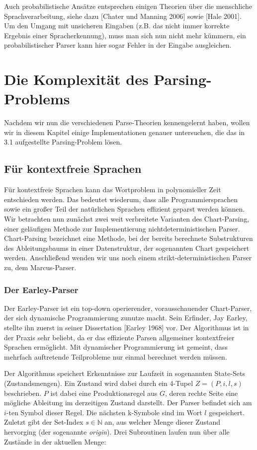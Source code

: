 \documentclass[12pt,a4paper]{article}
\theoremstyle{definition}
\begin{document}
		Auch probabilistische Ansätze entsprechen einigen Theorien über die menschliche Sprachverarbeitung, siehe dazu [Chater und Manning 2006] sowie [Hale 2001]. Um den Umgang mit unsicheren Eingaben (z.B. das nicht immer korrekte Ergebnis einer Spracherkennung), muss man sich nun nicht mehr kümmern, ein probabilistischer Parser kann hier sogar Fehler in der Eingabe ausgleichen.

\section{Die Komplexität des Parsing-Problems}
	Nachdem wir nun die verschiedenen Parse-Theorien kennengelernt haben, wollen wir in diesem Kapitel einige Implementationen genauer untersuchen, die das in 3.1 aufgestellte Parsing-Problem lösen.
	
	\subsection{Für kontextfreie Sprachen}
		Für kontextfreie Sprachen kann das Wortproblem in polynomieller Zeit entschieden werden. Das bedeutet wiederum, dass alle Programmiersprachen sowie ein großer Teil der natürlichen Sprachen effizient geparst werden können. Wir betrachten nun zunächst zwei weit verbreitete Varianten des Chart-Parsing, einer geläufigen Methode zur Implementierung nichtdeterministischen Parser. Chart-Parsing bezeichnet eine Methode, bei der bereits berechnete Substrukturen des Ableitungsbaums in einer Datenstruktur, der sogenannten Chart gespeichert werden. Anschließend wenden wir uns noch einem strikt-deterministischen Parser zu, dem Marcus-Parser.
		
		\subsubsection{Der Earley-Parser}
			Der Earley-Parser ist ein top-down operierender, vorausschauender Chart-Parser, der sich dynamische Programmierung zunutze macht. Sein Erfinder, Jay Earley, stellte ihn zuerst in seiner Dissertation [Earley 1968] vor. Der Algorithmus ist in der Praxis sehr beliebt, da er das effiziente Parsen allgemeiner kontextfreier Sprachen ermöglicht. Mit dynamischer Programmierung ist gemeint, dass mehrfach auftretende Teilprobleme nur einmal berechnet werden müssen.
		
			Der Algorithmus speichert Erkenntnisse zur Laufzeit in sogenannten State-Sets (Zustandsmengen). Ein Zustand wird dabei durch ein 4-Tupel $Z=(P, i, l, s)$ beschrieben. $P$ ist dabei eine Produktionsregel aus $G$, deren rechte Seite eine mögliche Ableitung im derzeitigen Zustand darstellt. Der Parser befindet sich am $i$-ten Symbol dieser Regel. Die nächsten k-Symbole sind im Wort $l$ gespeichert. Zuletzt gibt der Set-Index $s \in \mathbb{N}$ an, aus welcher Menge dieser Zustand hervorging (der sogenannte \textit{origin}). Drei Subroutinen laufen nun über alle Zustände in der aktuellen Menge: 
			
\end{document}
